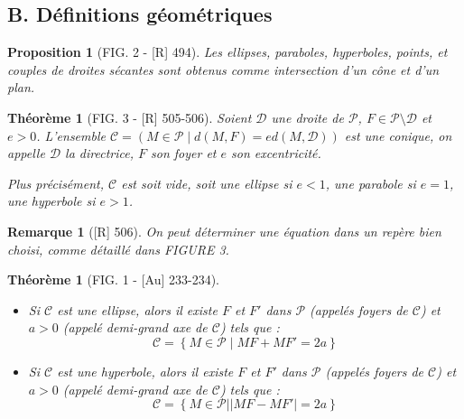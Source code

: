 \documentclass[10pt, a4paper, parskip=full, twoside, twocolumn]{report}
\newtheorem{theorem}[definition]{Théorème}
\newtheorem{proposition}[definition]{Proposition}
\newtheorem{remark}[definition]{Remarque}
\begin{document}
\subsection*{B. Définitions géométriques}
\begin{proposition}[FIG. 2 - \textnormal{[R] 494}]
	Les ellipses, paraboles, hyperboles, points, et couples de droites sécantes sont obtenus comme intersection d'un cône et d'un plan.
\end{proposition}

\begin{theorem}[FIG. 3 - \textnormal{[R] 505-506}]
	Soient $\mathcal{D}$ une droite de $\mathcal{P}$, $F\in \mathcal{P}\setminus \mathcal{D}$ et $e > 0$.
	L'ensemble $\mathcal{C} = \left(M\in\mathcal{P} \mid d(M,F) = ed(M,\mathcal{D})\right)$ est une conique, on appelle $\mathcal{D}$ la \emph{directrice}, $F$ son \emph{foyer} et $e$ son \emph{excentricité}.

	Plus précisément, $\mathcal{C}$ est soit vide, soit une ellipse si $e < 1$, une parabole si $e=1$, une hyperbole si $e> 1$.
\end{theorem}

\begin{remark}[\textnormal{[R] 506}]
	On peut déterminer une équation dans un repère bien choisi, comme détaillé dans FIGURE 3.
\end{remark}

\begin{theorem}[FIG. 1 - \textnormal{[Au] 233-234}]
	\begin{itemize}
		\item Si $\mathcal{C}$ est une ellipse, alors il existe $F$ et $F'$ dans $\mathcal{P}$ (appelés \emph{foyers} de $\mathcal{C}$) et $a > 0$ (appelé \emph{demi-grand axe de $\mathcal{C}$}) tels que : $$\mathcal{C} = \left\{M\in\mathcal{P} \mid MF + MF' = 2a\right\}$$
		\item Si $\mathcal{C}$ est une hyperbole, alors il existe $F$ et $F'$ dans $\mathcal{P}$ (appelés \emph{foyers de $\mathcal{C}$}) et $a>0$ (appelé \emph{demi-grand axe de $\mathcal{C}$}) tels que : $$\mathcal{C} = \left\{M\in\mathcal{P} \mid \vert MF - MF'\vert = 2a\right\}$$
	\end{itemize}
\end{theorem}
\end{document}
